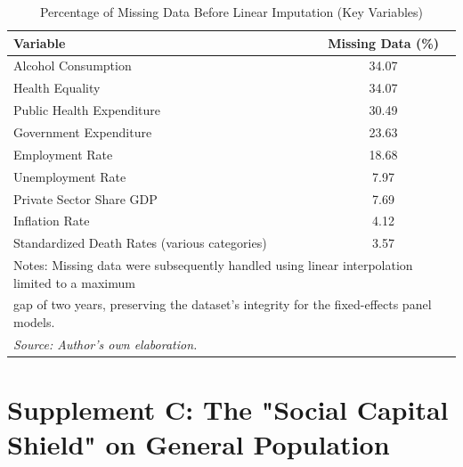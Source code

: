 \documentclass[en,magisterska]{pracamgr}
\begin{document}
\begin{table}[H]
\centering
\caption{Percentage of Missing Data Before Linear Imputation (Key Variables)}
\label{tab:missing_data}
\footnotesize
\begin{tabular}{l c}
\toprule
\textbf{Variable} & \textbf{Missing Data (\%)} \\
\midrule
Alcohol Consumption & 34.07 \\
Health Equality & 34.07 \\
Public Health Expenditure & 30.49 \\
Government Expenditure & 23.63 \\
Employment Rate & 18.68 \\
Unemployment Rate & 7.97 \\
Private Sector Share GDP & 7.69 \\
Inflation Rate & 4.12 \\
Standardized Death Rates (various categories) & 3.57 \\
\bottomrule
\multicolumn{2}{l}{\scriptsize Notes: Missing data were subsequently handled using linear interpolation limited to a maximum} \\
\multicolumn{2}{l}{\scriptsize gap of two years, preserving the dataset's integrity for the fixed-effects panel models.} \\
\multicolumn{2}{l}{\scriptsize \textit{Source: Author's own elaboration.}} \\
\end{tabular}
\end{table}

\newpage
\section*{Supplement C: The "Social Capital Shield" on General Population}
\end{document}
